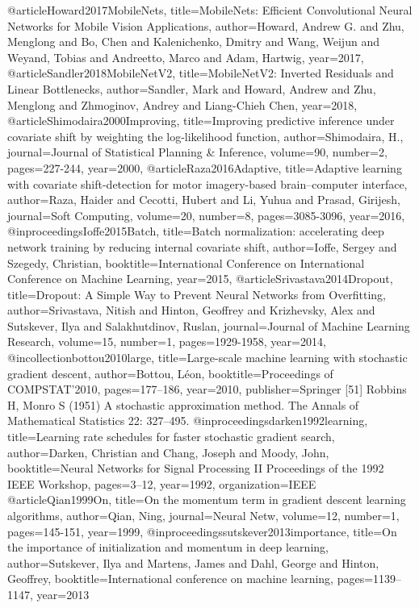 \documentclass[]{article}
\begin{document}
@article{Howard2017MobileNets,
	title={MobileNets: Efficient Convolutional Neural Networks for Mobile Vision Applications},
	author={Howard, Andrew G. and Zhu, Menglong and Bo, Chen and Kalenichenko, Dmitry and Wang, Weijun and Weyand, Tobias and Andreetto, Marco and Adam, Hartwig},
	year={2017},
}
@article{Sandler2018MobileNetV2,
	title={MobileNetV2: Inverted Residuals and Linear Bottlenecks},
	author={Sandler, Mark and Howard, Andrew and Zhu, Menglong and Zhmoginov, Andrey and Liang-Chieh Chen},
	year={2018},
}
@article{Shimodaira2000Improving,
	title={Improving predictive inference under covariate shift by weighting the log-likelihood function},
	author={Shimodaira, H.},
	journal={Journal of Statistical Planning & Inference},
	volume={90},
	number={2},
	pages={227-244},
	year={2000},
}
@article{Raza2016Adaptive,
	title={Adaptive learning with covariate shift-detection for motor imagery-based brain–computer interface},
	author={Raza, Haider and Cecotti, Hubert and Li, Yuhua and Prasad, Girijesh},
	journal={Soft Computing},
	volume={20},
	number={8},
	pages={3085-3096},
	year={2016},
}
@inproceedings{Ioffe2015Batch,
	title={Batch normalization: accelerating deep network training by reducing internal covariate shift},
	author={Ioffe, Sergey and Szegedy, Christian},
	booktitle={International Conference on International Conference on Machine Learning},
	year={2015},
}
@article{Srivastava2014Dropout,
	title={Dropout: A Simple Way to Prevent Neural Networks from Overfitting},
	author={Srivastava, Nitish and Hinton, Geoffrey and Krizhevsky, Alex and Sutskever, Ilya and Salakhutdinov, Ruslan},
	journal={Journal of Machine Learning Research},
	volume={15},
	number={1},
	pages={1929-1958},
	year={2014},
}
@incollection{bottou2010large,
	title={Large-scale machine learning with stochastic gradient descent},
	author={Bottou, L{\'e}on},
	booktitle={Proceedings of COMPSTAT'2010},
	pages={177--186},
	year={2010},
	publisher={Springer}
}
[51] Robbins H, Monro S (1951) A stochastic approximation method. The Annals of Mathematical Statistics 22: 327–495.
@inproceedings{darken1992learning,
	title={Learning rate schedules for faster stochastic gradient search},
	author={Darken, Christian and Chang, Joseph and Moody, John},
	booktitle={Neural Networks for Signal Processing II Proceedings of the 1992 IEEE Workshop},
	pages={3--12},
	year={1992},
	organization={IEEE}
}
@article{Qian1999On,
	title={On the momentum term in gradient descent learning algorithms},
	author={Qian, Ning},
	journal={Neural Netw},
	volume={12},
	number={1},
	pages={145-151},
	year={1999},
}
@inproceedings{sutskever2013importance,
	title={On the importance of initialization and momentum in deep learning},
	author={Sutskever, Ilya and Martens, James and Dahl, George and Hinton, Geoffrey},
	booktitle={International conference on machine learning},
	pages={1139--1147},
	year={2013}
}
\end{document}
